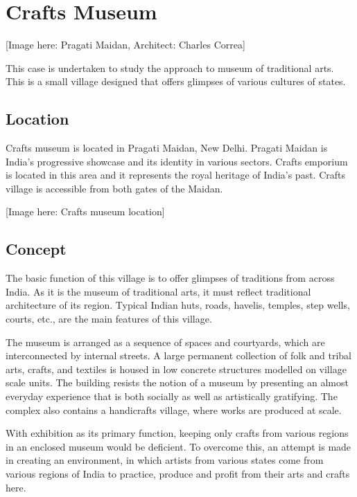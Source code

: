 \section{Crafts Museum} %
\label{sec:ce}

[Image here: Pragati Maidan, Architect: Charles Correa]

This case is undertaken to study the approach to museum of traditional arts. This is a small village designed that offers glimpses of various cultures of states.

\subsection{Location} %
\label{sub:ce_loc}

Crafts museum is located in Pragati Maidan, New Delhi. Pragati Maidan is India's progressive showcase and its identity in various sectors. Crafts emporium is located in this area and it represents the royal heritage of India's past. Crafts village is accessible from both gates of the Maidan.

[Image here: Crafts museum location]


\subsection{Concept} %
\label{sub:ce_concept}

The basic function of this village is to offer glimpses of traditions from across India. As it is the museum of traditional arts, it must reflect traditional architecture of its region. Typical Indian huts, roads, havelis, temples, step wells, courts, etc., are the main features of this village.

The museum is arranged as a sequence of spaces and courtyards, which are interconnected by internal streets. A large permanent collection of folk and tribal arts, crafts, and textiles is housed in low concrete structures modelled on village scale units. The building resists the notion of a museum by presenting an almost everyday experience that is both socially as well as artistically gratifying. The complex also contains a handicrafts village, where works are produced at scale.

With exhibition as its primary function, keeping only crafts from various regions in an enclosed museum would be deficient. To overcome this, an attempt is made in creating an environment, in which artists from various states come from various regions of India to practice, produce and profit from their arts and crafts here.

